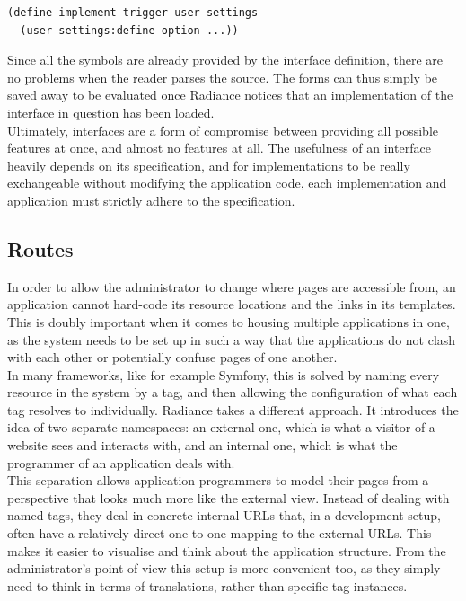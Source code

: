 \documentclass{sig-alternate}
\begin{document}
\begin{verbatim}
(define-implement-trigger user-settings
  (user-settings:define-option ...))
\end{verbatim}

Since all the symbols are already provided by the interface definition, there are no problems when the reader parses the source. The forms can thus simply be saved away to be evaluated once Radiance notices that an implementation of the interface in question has been loaded. \\

Ultimately, interfaces are a form of compromise between providing all possible features at once, and almost no features at all. The usefulness of an interface heavily depends on its specification, and for implementations to be really exchangeable without modifying the application code, each implementation and application must strictly adhere to the specification.

\subsection{Routes}
In order to allow the administrator to change where pages are accessible from, an application cannot hard-code its resource locations and the links in its templates. This is doubly important when it comes to housing multiple applications in one, as the system needs to be set up in such a way that the applications do not clash with each other or potentially confuse pages of one another. \\

In many frameworks, like for example Symfony\cite{symfony}, this is solved by naming every resource in the system by a tag, and then allowing the configuration of what each tag resolves to individually. Radiance takes a different approach. It introduces the idea of two separate namespaces: an external one, which is what a visitor of a website sees and interacts with, and an internal one, which is what the programmer of an application deals with. \\

This separation allows application programmers to model their pages from a perspective that looks much more like the external view. Instead of dealing with named tags, they deal in concrete internal URLs that, in a development setup, often have a relatively direct one-to-one mapping to the external URLs. This makes it easier to visualise and think about the application structure. From the administrator's point of view this setup is more convenient too, as they simply need to think in terms of translations, rather than specific tag instances. \\
\end{document}
